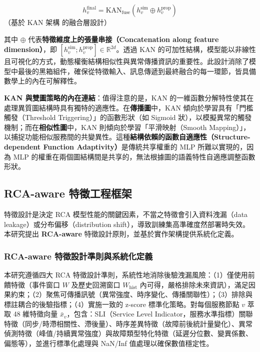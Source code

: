 \documentclass[10pt,a4paper,twocolumn]{article}
\begin{document}
\begin{equation}
h_v^{\text{final}} = \text{KAN}_{\text{fuse}}\left( h_v^{\text{sim}} \oplus h_v^{\text{prop}} \right)
\end{equation}
（基於 KAN 架構 \cite{kan2024} 的融合層設計）

其中 $\oplus$ 代表\textbf{特徵維度上的張量串接（Concatenation along feature dimension）}，即 $[h_v^{\text{sim}}; h_v^{\text{prop}}] \in \mathbb{R}^{2d}$。透過 KAN 的可加性結構，模型能以非線性且可視化的方式，動態權衡結構相似性與異常傳播資訊的重要性。此設計消除了模型中最後的黑箱組件，確保從特徵輸入、訊息傳遞到最終融合的每一環節，皆具備數學上的內在可解釋性。

\textbf{KAN 與雙圖策略的內在連結}：值得注意的是，KAN 的一維函數分解特性使其在處理異質圖結構時具有獨特的適應性。在\textbf{傳播圖}中，KAN 傾向於學習具有「門檻觸發（Threshold Triggering）」的函數形狀（如 Sigmoid 狀），以模擬異常的觸發機制；而在\textbf{相似性圖}中，KAN 則傾向於學習「平滑映射（Smooth Mapping）」，以捕捉功能相似服務間的共變異性。這種\textbf{結構依賴的函數自適應性（Structure-dependent Function Adaptivity）}是傳統共享權重的 MLP 所難以實現的，因為 MLP 的權重在兩個圖結構間是共享的，無法根據圖的語義特性自適應調整函數形狀。

\subsection{RCA-aware 特徵工程框架}

特徵設計是決定 RCA 模型性能的關鍵因素，不當之特徵會引入資料洩漏（data leakage）或分布偏移（distribution shift），導致訓練集高準確度然部署時失效。本研究提出 \textbf{RCA-aware} 特徵設計原則，並基於實作架構提供系統化定義。

\subsubsection{RCA-aware 特徵設計準則與系統化定義}

本研究遵循四大 RCA 特徵設計準則，系統性地消除後驗洩漏風險：（1）僅使用前饋特徵（事件窗口 $W$ 及歷史回溯窗口 $W_{\text{hist}}$ 內可得，嚴格排除未來資訊），滿足因果約束；（2）聚焦可傳播訊號（異常強度、時序變化、傳播關聯性）；（3）排除與標註耦合的後驗指標；（4）實施一致的 z-score 標準化策略。對每個服務節點 $v$ 萃取 48 維特徵向量 $\bar{x}_v$，包含：SLI（Service Level Indicator，服務水準指標）關聯特徵（同步/時滯相關性、滯後量）、時序差異特徵（故障前後統計量變化）、異常偵測特徵（峰值/持續異常強度）與故障類型特化特徵（延遲分位數、變異係數、偏態等），並進行標準化處理與 NaN/Inf 值處理以確保數值穩定性。
\end{document}
